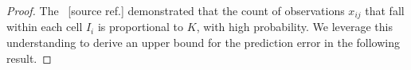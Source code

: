 \documentclass[twoside,11pt]{article}
\makeatletter
\newcommand{\rev}[1]{{\color{revisionred}#1}}
\newcommand{\discardlabel}[1]{}
\newcommand{\discardtwo}[2]{}
\newcommand{\legacyref}[1]{\textup{[source ref.]}}
\newcommand{\legacyeqref}[1]{\textup{[source equation]}}
\newenvironment{legacycomparison}{%
  \begingroup\color{legacygray}%
  \let\label\discardlabel
  \let\originallabel\discardlabel
  \let\ref\legacyref
  \let\pageref\legacyref
  \let\eqref\legacyeqref
  \let\cref\legacyref
  \let\Cref\legacyref
  \let\autoref\legacyref
  \let\aliasref\discardtwo
}{\endgroup}
\newcommand{\aliasref}[2]{%
  \@ifundefined{r@#2}{}{%
    \expandafter\let\csname r@#1\expandafter\endcsname\csname r@#2\endcsname}}
\makeatother
\begin{document}
\begin{legacycomparison}
\begin{proof}
The ~\ref{lemma_14} demonstrated that the count of observations \(x_{ij}\) that fall within each cell \(I_i\) is proportional to \(K\), with high probability. We leverage this understanding to derive an \rev{upper bound for the prediction error} in the following result. 
\end{proof}





\end{legacycomparison}
\end{document}
